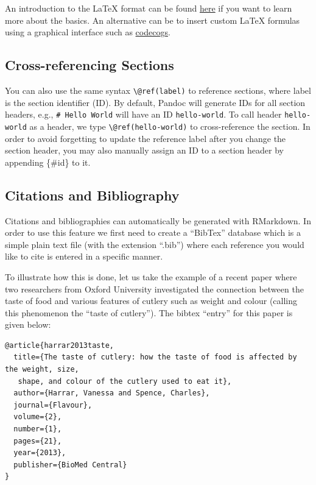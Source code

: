 \documentclass[]{book}
\theoremstyle{definition}
\theoremstyle{definition}
\theoremstyle{remark}
\begin{document}
An introduction to the LaTeX format can be found
\href{http://www.math.harvard.edu/texman/}{here} if you want to learn
more about the basics. An alternative can be to insert custom LaTeX
formulas using a graphical interface such as
\href{https://www.codecogs.com/latex/eqneditor.php}{codecogs}.

\subsection{Cross-referencing
Sections}\label{cross-referencing-sections}

You can also use the same syntax \texttt{\textbackslash{}@ref(label)} to
reference sections, where label is the section identifier (ID). By
default, Pandoc will generate IDs for all section headers, e.g.,
\texttt{\#\ Hello\ World} will have an ID \texttt{hello-world}. To call
header \texttt{hello-world} as a header, we type
\texttt{\textbackslash{}@ref(hello-world)} to cross-reference the
section. In order to avoid forgetting to update the reference label
after you change the section header, you may also manually assign an ID
to a section header by appending \{\#id\} to it.

\subsection{Citations and
Bibliography}\label{citations-and-bibliography}

Citations and bibliographies can automatically be generated with
RMarkdown. In order to use this feature we first need to create a
``BibTex'' database which is a simple plain text file (with the
extension ``.bib'') where each reference you would like to cite is
entered in a specific manner.

To illustrate how this is done, let us take the example of a recent
paper where two researchers from Oxford University investigated the
connection between the taste of food and various features of cutlery
such as weight and colour (calling this phenomenon the ``taste of
cutlery''). The bibtex ``entry'' for this paper is given below:

\begin{verbatim}
@article{harrar2013taste,
  title={The taste of cutlery: how the taste of food is affected by the weight, size,
   shape, and colour of the cutlery used to eat it},
  author={Harrar, Vanessa and Spence, Charles},
  journal={Flavour},
  volume={2},
  number={1},
  pages={21},
  year={2013},
  publisher={BioMed Central}
}
\end{verbatim}
\end{document}
